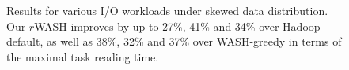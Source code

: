 \documentclass[conference]{IEEEtran}
\begin{document}

\begin{figure}[!t]
	\centering
	\quad\quad %
	\quad\quad
	\vspace{-1ex}
	\caption{Results for various I/O workloads under skewed data distribution. Our $r$WASH improves by up to 27\%, 41\% and 34\% over Hadoop-default, as well as 38\%, 32\% and 37\% over WASH-greedy in terms of the maximal task reading time.
	}
	\label{Fig:unbalance}
	\vspace{-0.35cm}
\end{figure}

\end{document}
